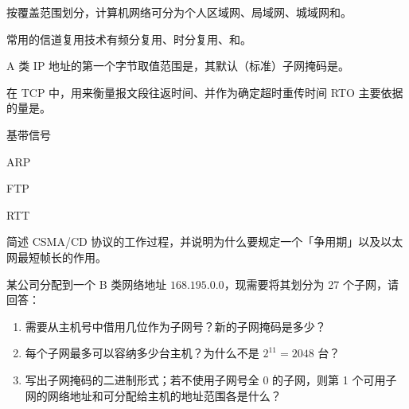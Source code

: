 \documentclass[a4paper,11pt]{article}
\begin{document}
\q 按覆盖范围划分，计算机网络可分为个人区域网、局域网、城域网和\fillblank{}。

\q 常用的信道复用技术有频分复用、时分复用、\fillblank{}和\fillblank{}。

\q A 类 IP 地址的第一个字节取值范围是\fillblank{}，其默认（标准）子网掩码是\fillblank{}。

\q 在 TCP 中，用来衡量报文段往返时间、并作为确定超时重传时间 RTO 主要依据的量是\fillblank{}。


\q 基带信号\anslines{1.2cm}

\q ARP\anslines{1.2cm}

\q FTP\anslines{1.2cm}

\q RTT\anslines{1.2cm}


\q 简述 CSMA/CD 协议的工作过程，并说明为什么要规定一个「争用期」以及以太网最短帧长的作用。\anslines{4cm}

\q 某公司分配到一个 B 类网络地址 \(168.195.0.0\)，现需要将其划分为 27 个子网，请回答：
\begin{enumerate}[leftmargin=2em, itemsep=2pt, topsep=3pt]
  \item 需要从主机号中借用几位作为子网号？新的子网掩码是多少？
  \item 每个子网最多可以容纳多少台主机？为什么不是 \(2^{11}=2048\) 台？
  \item 写出子网掩码的二进制形式；若不使用子网号全 0 的子网，则第 1 个可用子网的网络地址和可分配给主机的地址范围各是什么？
\end{enumerate}
\anslines{6cm}
\end{document}
